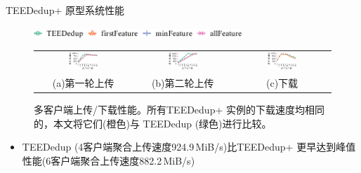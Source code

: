 \documentclass{beamer}
\newcommand{\sysnameS}{TEEDedup }
\newcommand{\prototype}{TEEDedup+ }
\begin{document}
\begin{frame}{\prototype 原型系统性能}
    \begin{figure}[!htb]
        \centering
        \includegraphics[width=0.7\textwidth]{../pic/featurespy/plot/performance/multiClient/legend.pdf}
        \vspace{5pt}\\
        \begin{tabular}{@{\ }c@{\ }c@{\ }c}
            \includegraphics[width=0.32\textwidth]{../pic/featurespy/plot/performance/multiClient/upload_1st_line.pdf} &
            \includegraphics[width=0.32\textwidth]{../pic/featurespy/plot/performance/multiClient/upload_2nd_line.pdf} &
            \includegraphics[width=0.32\textwidth]{../pic/featurespy/plot/performance/multiClient/download_line.pdf}     \\
            {\small (a)第一轮上传}                                                                                     &
            {\small (b)第二轮上传}                                                                                     &
            {\small (c)下载}
        \end{tabular}
        \caption{多客户端上传/下载性能。所有\prototype 实例的下载速度均相同的，本文将它们(橙色)与 \sysnameS(绿色)进行比较。}
        \label{fig:featurespy-expMultiClientThroughput}
    \end{figure}

    \begin{itemize}
        \item \sysnameS (4客户端聚合上传速度924.9\,MiB/s)比\prototype 更早达到峰值性能(6客户端聚合上传速度882.2\,MiB/s)
    \end{itemize}
\end{frame}
\end{document}
